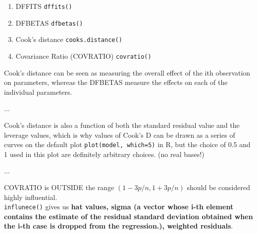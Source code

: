 \documentclass[a4paper, 11pt, twoside]{article}
\begin{document}
\begin{enumerate}
	\item DFFITS \texttt{dffits()}
	\item DFBETAS \texttt{dfbetas()}
	\item Cook's distance \texttt{cooks.distance()}
	\item Covariance Ratio (COVRATIO) \texttt{covratio()}
\end{enumerate}

Cook's distance can be seen as measuring the overall effect of the ith observation on parameters, whereas the DFBETAS measure the effects on each of the individual parameters.

...

Cook's distance is also a function of both the standard residual value and the leverage values, which is why values of Cook's D can be drawn as a series of curves on the default plot \texttt{plot(model, which=5)} in R, but the choice of 0.5 and 1 used in this plot are definitely arbitrary choices. (no real bases!)

... 

COVRATIO is OUTSIDE the range $(1-3p/n, 1+3p/n)$ should be considered highly influential.\\

\texttt{influnece()} gives us \textbf{hat values, sigma (a vector whose i-th element contains the estimate of the residual standard deviation obtained when the i-th case is dropped from the regression.), weighted residuals}.\\
\end{document}
